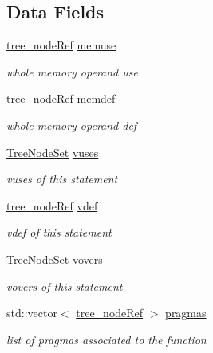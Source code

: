 \subsection*{Data Fields}
\begin{DoxyCompactItemize}
\item 
\hyperlink{tree__node_8hpp_a6ee377554d1c4871ad66a337eaa67fd5}{tree\+\_\+node\+Ref} \hyperlink{structgimple__node_a8062a53f620774c742783020b76c6455}{memuse}
\begin{DoxyCompactList}\small\item\em whole memory operand use \end{DoxyCompactList}\item 
\hyperlink{tree__node_8hpp_a6ee377554d1c4871ad66a337eaa67fd5}{tree\+\_\+node\+Ref} \hyperlink{structgimple__node_a5fe65e3ba8c8a4041353a23a35aea9fc}{memdef}
\begin{DoxyCompactList}\small\item\em whole memory operand def \end{DoxyCompactList}\item 
\hyperlink{classTreeNodeSet}{Tree\+Node\+Set} \hyperlink{structgimple__node_a8dab368ebcdedf9083741219ad63e12f}{vuses}
\begin{DoxyCompactList}\small\item\em vuses of this statement \end{DoxyCompactList}\item 
\hyperlink{tree__node_8hpp_a6ee377554d1c4871ad66a337eaa67fd5}{tree\+\_\+node\+Ref} \hyperlink{structgimple__node_ac3e8056bd58becfd11f356427352b6fa}{vdef}
\begin{DoxyCompactList}\small\item\em vdef of this statement \end{DoxyCompactList}\item 
\hyperlink{classTreeNodeSet}{Tree\+Node\+Set} \hyperlink{structgimple__node_ad998aebf099744eb9aacb5425ecbb4da}{vovers}
\begin{DoxyCompactList}\small\item\em vovers of this statement \end{DoxyCompactList}\item 
std\+::vector$<$ \hyperlink{tree__node_8hpp_a6ee377554d1c4871ad66a337eaa67fd5}{tree\+\_\+node\+Ref} $>$ \hyperlink{structgimple__node_ab07629fae46b91a4c68a596da2b10ebe}{pragmas}
\begin{DoxyCompactList}\small\item\em list of pragmas associated to the function \end{DoxyCompactList}\item 

\end{DoxyCompactItemize}
